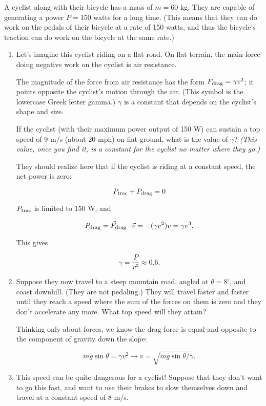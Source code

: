 \documentclass[12pt]{article}
\begin{document}
A cyclist along with their bicycle has a mass of $m=60$ kg. They are capable of generating a power $P=150$ watts for a long time. (This means that they can do work on the pedals of their bicycle at a rate of 150 watts, and thus the bicycle's traction can do work on the bicycle at the same rate.)

\begin{enumerate}
\item Let's imagine this cyclist riding on a flat road. On flat terrain, the main force doing negative work on the cyclist is air resistance.

The magnitude of the force from air resistance has the form $F_{\rm drag} = \gamma v^2$; it points opposite the cyclist's motion through the air. (This symbol is the lowercase Greek letter gamma.) $\gamma$ is a constant that depends on the cyclist's shape and size.

If the cyclist (with their maximum power output of 150 W) can sustain a top speed of 9 m/s (about 20 mph) on flat ground, what is the value of $\gamma$? {\it (This value, once you find it, is a constant for the cyclist no matter where they go.)}

{\color{red}They should realize here that if the cyclist is riding at a constant speed, the net power is zero:
	
$$
	P_{\rm{trac}} + P_{\rm {drag}} = 0
$$

$P_{\rm{trac}}$ is limited to 150 W, and 

$$P_{\rm {drag}} =  \vec F_{\rm {drag}} \cdot \vec v = -(\gamma v^2) v = \gamma v^3.$$

This gives

$$\gamma = \frac{P}{v^3} \approx 0.6.$$
}

\item Suppose they now travel to a steep mountain road, angled at $\theta=8^\circ$, and coast downhill. (They are not pedaling.) They will travel faster and faster until they reach a speed where the sum of the forces on them is zero and they don't accelerate any more. What top speed will they attain? 

{\color{red}Thinking only about forces, we know the drag force is equal and opposite to the component of gravity down the slope:
	
	$$
	mg \sin \theta = \gamma v^2 \rightarrow v = \sqrt{mg \sin \theta / \gamma}.
	$$
	
}


\item This speed can be quite dangerous for a cyclist! Suppose that they don't want to go this fast, and want to use their brakes to slow themselves down and travel at a constant speed of 8 m/s.


\end{enumerate}
\end{document}
